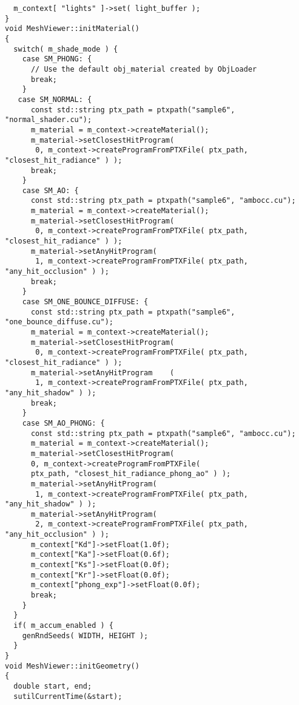 \begin{verbatim}
  m_context[ "lights" ]->set( light_buffer );
}
void MeshViewer::initMaterial()
{
  switch( m_shade_mode ) {
    case SM_PHONG: {
      // Use the default obj_material created by ObjLoader
      break;
    }
   case SM_NORMAL: {
      const std::string ptx_path = ptxpath("sample6", "normal_shader.cu");
      m_material = m_context->createMaterial();
      m_material->setClosestHitProgram(
       0, m_context->createProgramFromPTXFile( ptx_path, "closest_hit_radiance" ) );
      break;
    }
    case SM_AO: {
      const std::string ptx_path = ptxpath("sample6", "ambocc.cu");
      m_material = m_context->createMaterial();
      m_material->setClosestHitProgram(
       0, m_context->createProgramFromPTXFile( ptx_path, "closest_hit_radiance" ) );
      m_material->setAnyHitProgram(
       1, m_context->createProgramFromPTXFile( ptx_path, "any_hit_occlusion" ) );    
      break;
    }  
    case SM_ONE_BOUNCE_DIFFUSE: {
      const std::string ptx_path = ptxpath("sample6", "one_bounce_diffuse.cu");
      m_material = m_context->createMaterial();
      m_material->setClosestHitProgram(
       0, m_context->createProgramFromPTXFile( ptx_path, "closest_hit_radiance" ) );
      m_material->setAnyHitProgram    (
       1, m_context->createProgramFromPTXFile( ptx_path, "any_hit_shadow" ) );
      break;
    }
    case SM_AO_PHONG: {
      const std::string ptx_path = ptxpath("sample6", "ambocc.cu");
      m_material = m_context->createMaterial();
      m_material->setClosestHitProgram( 
      0, m_context->createProgramFromPTXFile( 
      ptx_path, "closest_hit_radiance_phong_ao" ) );
      m_material->setAnyHitProgram(
       1, m_context->createProgramFromPTXFile( ptx_path, "any_hit_shadow" ) );
      m_material->setAnyHitProgram(
       2, m_context->createProgramFromPTXFile( ptx_path, "any_hit_occlusion" ) );
      m_context["Kd"]->setFloat(1.0f);
      m_context["Ka"]->setFloat(0.6f);
      m_context["Ks"]->setFloat(0.0f);
      m_context["Kr"]->setFloat(0.0f);
      m_context["phong_exp"]->setFloat(0.0f);
      break;
    }
  }
  if( m_accum_enabled ) {
    genRndSeeds( WIDTH, HEIGHT );
  }
}
void MeshViewer::initGeometry()
{
  double start, end;
  sutilCurrentTime(&start);


\end{verbatim}
